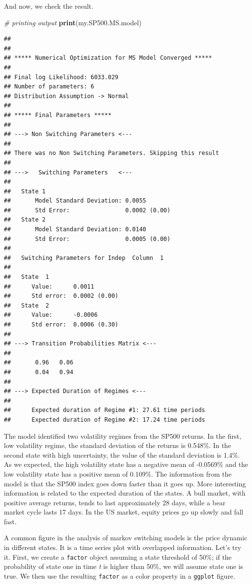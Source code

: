 \documentclass[11pt,]{book}
\newenvironment{Shaded}{\begin{snugshade}}{\end{snugshade}}
\newcommand{\KeywordTok}[1]{\textcolor[rgb]{0.27,0.27,0.27}{\textbf{#1}}}
\newcommand{\CommentTok}[1]{\textcolor[rgb]{0.56,0.35,0.01}{\textit{#1}}}
\newcommand{\NormalTok}[1]{#1}
\begin{document}
And now, we check the result.

\begin{Shaded}
\begin{Highlighting}[]
\CommentTok{# printing output}
\KeywordTok{print}\NormalTok{(my.SP500.MS.model)    }
\end{Highlighting}
\end{Shaded}

\begin{verbatim}
## 
## 
## ***** Numerical Optimization for MS Model Converged *****
## 
## Final log Likelihood: 6033.029 
## Number of parameters: 6 
## Distribution Assumption -> Normal 
## 
## ***** Final Parameters *****
## 
## ---> Non Switching Parameters <---
## 
## There was no Non Switching Parameters. Skipping this result
## 
## --->   Switching Parameters   <---
## 
##   State 1
##       Model Standard Deviation: 0.0055
##       Std Error:                0.0002 (0.00)
##   State 2
##       Model Standard Deviation: 0.0140
##       Std Error:                0.0005 (0.00)
## 
##   Switching Parameters for Indep  Column  1 
## 
##   State  1
##      Value:      0.0011
##      Std error:  0.0002 (0.00)
##   State  2
##      Value:      -0.0006
##      Std error:  0.0006 (0.30)
## 
## ---> Transition Probabilities Matrix <---
## 
##       0.96   0.06   
##       0.04   0.94   
## 
## ---> Expected Duration of Regimes <---
## 
##      Expected duration of Regime #1: 27.61 time periods
##      Expected duration of Regime #2: 17.24 time periods
\end{verbatim}

The model identified two volatility regimes from the SP500 returns. In
the first, low volatility regime, the standard deviation of the returns
is 0.548\%. In the second state with high uncertainty, the value of the
standard deviation is 1.4\%. As we expected, the high volatility state
has a negative mean of -0.0569\% and the low volatility state has a
positive mean of 0.109\%. The information from the model is that the
SP500 index goes down faster than it goes up. More interesting
information is related to the expected duration of the states. A bull
market, with positive average returns, tends to last approximately 28
days, while a bear market cycle lasts 17 days. In the US market, equity
prices go up slowly and fall fast.

A common figure in the analysis of markov switching models is the price
dynamic in different states. It is a time series plot with overlapped
information. Let's try it. First, we create a \texttt{factor} object
assuming a state threshold of 50\%; if the probability of state one in
time \emph{t} is higher than 50\%, we will assume state one is true. We
then use the resulting \texttt{factor} as a color property in a
\texttt{ggplot} figure.
\end{document}

